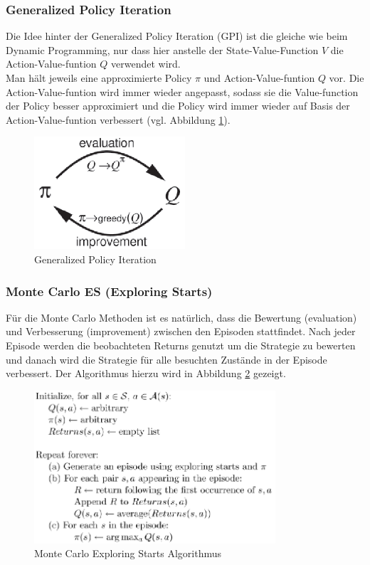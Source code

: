 \documentclass[10pt]{scrartcl}
\begin{document}
\subsubsection{Generalized Policy Iteration}
Die Idee hinter der Generalized Policy Iteration (GPI) ist die gleiche wie beim Dynamic Programming, nur dass hier anstelle der State-Value-Function $V$ die Action-Value-funtion $Q$ verwendet wird.\\
Man hält jeweils eine approximierte Policy $\pi$ und Action-Value-funtion $Q$ vor. Die Action-Value-funtion wird immer wieder angepasst, sodass sie die Value-function der Policy besser approximiert und die Policy wird immer wieder auf Basis der Action-Value-funtion verbessert (vgl. Abbildung \ref{fig:MC_GPI}).

\begin{figure}[htbp]
	\centering	\includegraphics[width=0.5\textwidth]{Bilder/MC_GPI.png}
	\caption{Generalized Policy Iteration}
	\label{fig:MC_GPI}
\end{figure}

\subsubsection{Monte Carlo ES (Exploring Starts)}
Für die Monte Carlo Methoden ist es natürlich, dass die Bewertung (evaluation) und Verbesserung (improvement) zwischen den Episoden stattfindet. Nach jeder Episode werden die beobachteten Returns genutzt um die Strategie zu bewerten und danach wird die Strategie für alle besuchten Zustände in der Episode verbessert. Der Algorithmus hierzu wird in Abbildung \ref{fig:MC_ES} gezeigt.

\begin{figure}[htbp]
	\centering	\includegraphics[width=0.8\textwidth]{Bilder/MC_ES.png}
	\caption{Monte Carlo Exploring Starts Algorithmus}
	\label{fig:MC_ES}
\end{figure}
\end{document}
